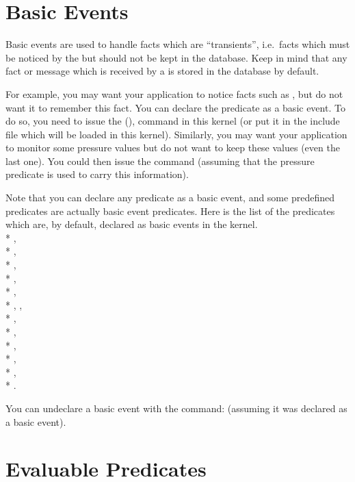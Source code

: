 \section{Basic Events}

Basic events are used to handle facts which are ``transients'', i.e.\ facts
which must be noticed by the \CPK{} but should not be kept in the
database. Keep in mind that any fact or message which is received by a
\CPK{} is stored in the database by default.

For example, you may want your application to notice facts such as
, but do not want it to remember this fact. You can declare
the  predicate as a basic event. To do so, you need to issue
the  (),
command in this kernel (or put it in the include file which will be loaded
in this kernel). Similarly, you may want your application to monitor some
pressure values but do not want to keep these values (even the last one).
You could then issue the command  (assuming that
the pressure predicate is used to carry this information).

Note that you can declare any predicate as a basic event, and some
predefined predicates are actually basic event predicates.
Here is the list of the predicates which are, by default, declared as
basic events in the kernel. \\*
, \\*
, \\*
, \\*
, \\*
, \\*
,
, \\*
, \\*
, \\*
, \\*
, \\*
, \\*
.

You can undeclare a basic event with the command: 
(assuming it was declared as a basic event).

\section{Evaluable Predicates}

